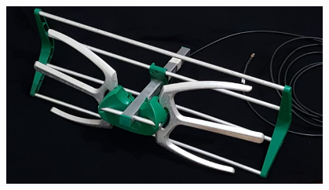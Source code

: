 \begin{frame}
\begin{columns}
\begin{itemize}
		\end{itemize}
		\begin{figure}
			\includegraphics[scale=0.20]{antena}
		\end{figure}
\end{columns}
\end{frame}